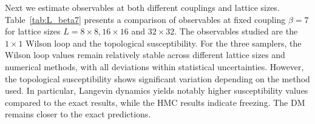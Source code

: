 \documentclass[a4paper,11pt]{article}
\begin{document}
Next we estimate observables at both different couplings and lattice sizes. Table~\ref{tab:L_beta7} presents a comparison of observables at fixed coupling $\beta = 7$ for lattice sizes $L=8\times 8, 16\times 16$ and $32\times 32$. The observables studied are the $1 \times 1$ Wilson loop and the topological susceptibility. For the three samplers, the Wilson loop values remain relatively stable across different lattice sizes and numerical methods, with all deviations within statistical uncertainties. However, the topological susceptibility shows significant variation depending on the method used. In particular, Langevin dynamics yields notably higher susceptibility values compared to the exact results, while the HMC results indicate freezing. The DM remains closer to the exact predictions.

\begin{table}[hbpt!] 
    \centering 
    \caption{Comparison of observables for $\beta=7$ at different lattice sizes}
    \label{tab:L_beta7}
    \renewcommand{\arraystretch}{1.3}
\end{table}
\end{document}
